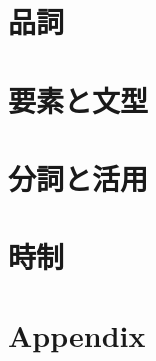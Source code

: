 \documentclass[11pt,a4paper,titlepage]{jsarticle}
\title{}
\author{}
\date{\today}
\begin{document}
\section{品詞}



\section{要素と文型}



\section{分詞と活用}



\section{時制}



\newpage

\section*{Appendix}


\end{document}
